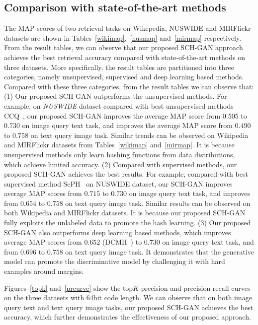 \documentclass[journal]{IEEEtran}
\begin{document}
\subsection{Comparison with state-of-the-art methods}
The MAP scores of two retrieval tasks on Wikepedia, NUSWIDE and MIRFlickr datasets are shown in Tables~\ref{wikimap},~\ref{nusmap} and~\ref{mirmap} respectively. From the result tables, we can observe that our proposed SCH-GAN approach achieves the best retrieval accuracy compared with state-of-the-art methods on three datasets. More specifically, the result tables are partitioned into three categories, namely unsupervised, supervised and deep learning based methods. Compared with these three categories, from the result tables we can observe that: (1) Our proposed SCH-GAN outperforms the unsupervised methods. For example, on \textit{NUSWIDE} dataset compared with best unsupervised methods CCQ~\cite{CCQ}, our proposed SCH-GAN improves the average MAP score from $0.505$ to $0.730$ on image query text task, and improves the average MAP score from $0.490$ to $0.758$ on text query image task. Similar trends can be observed on Wikipedia and MIRFlickr datasets from Tables~\ref{wikimap} and~\ref{mirmap}. It is because unsupervised methods only learn hashing functions from data distributions, which achieve limited accuracy. (2) Compared with supervised methods, our proposed SCH-GAN achieves the best results. For example, compared with best supervised method SePH~\cite{SePH} on NUSWIDE dataset, our SCH-GAN improves average MAP scores from $0.715$ to $0.730$ on image query text task, and improves from $0.654$ to $0.758$ on text query image task. Similar results can be observed on both Wikipedia and MIRFlickr datasets.  It is because our proposed SCH-GAN fully exploits the unlabeled data to promote the hash learning. (3) Our proposed SCH-GAN also outperforms deep learning based methods, which improves average MAP scores from $0.652$ (DCMH~\cite{DCMH}) to $0.730$ on image query text task, and from $0.696$ to $0.758$ on text query image task. It demonstrates that the generative model can  promote the discriminative model by challenging it with hard examples around margins.

Figures~\ref{topk} and~\ref{prcurve} show the top$K$-precision and precision-recall curves on the three datasets with 64bit code length. We can observe that on both image query text and text query image tasks, our proposed SCH-GAN achieves the best accuracy, which further demonstrates the effectiveness of our proposed approach.
\end{document}
